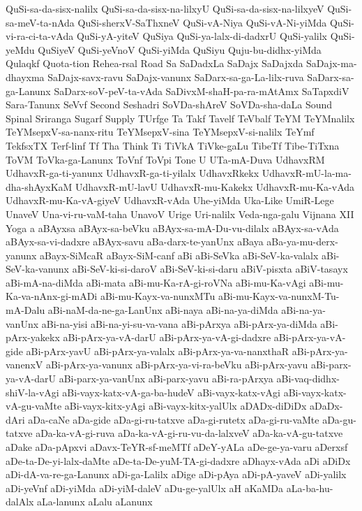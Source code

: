 {QuSi-sa-da-sisx-nalilx
QuSi-sa-da-sisx-na-lilxyU
QuSi-sa-da-sisx-na-lilxyeV
QuSi-sa-meV-ta-nAda
QuSi-sherxV-SaThxneV
QuSi-vA-Niya
QuSi-vA-Ni-yiMda
QuSi-vi-ra-ci-ta-vAda
QuSi-yA-yiteV
QuSiya
QuSi-ya-lalx-di-dadxrU
QuSi-yalilx
QuSi-yeMdu
QuSiyeV
QuSi-yeVnoV
QuSi-yiMda
QuSiyu
Quju-bu-didhx-yiMda
Qulaqkf
Quota-tion
Rehea-rsal
Road
Sa
SaDadxLa
SaDajx
SaDajxda
SaDajx-ma-dhayxma
SaDajx-savx-ravu
SaDajx-vanunx
SaDarx-sa-ga-La-lilx-ruva
SaDarx-sa-ga-Lanunx
SaDarx-soV-peV-ta-vAda
SaDivxM-shaH-pa-ra-mAtAmx
SaTapxdiV
Sara-Tanunx
SeVvf
Second
Seshadri
SoVDa-shAreV
SoVDa-sha-daLa
Sound
Spinal
Sriranga
Sugarf
Supply
TUrfge
Ta
Takf
Tavelf
TeVbalf
TeYM
TeYMnalilx
TeYMsepxV-sa-nanx-ritu
TeYMsepxV-sina
TeYMsepxV-si-nalilx
TeYmf
TekfsxTX
Terf-linf
Tf
Tha
Think
Ti
TiVkA
TiVke-gaLu
TibeTf
Tibe-TiTxna
ToVM
ToVka-ga-Lanunx
ToVnf
ToVpi
Tone
U
UTa-mA-Duva
UdhavxRM
UdhavxR-ga-ti-yanunx
UdhavxR-ga-ti-yilalx
UdhavxRkekx
UdhavxR-mU-la-ma-dha-shAyxKaM
UdhavxR-mU-lavU
UdhavxR-mu-Kakekx
UdhavxR-mu-Ka-vAda
UdhavxR-mu-Ka-vA-giyeV
UdhavxR-vAda
Uhe-yiMda
Uka-Like
UmiR-Lege
UnaveV
Una-vi-ru-vaM-taha
UnavoV
Urige
Uri-nalilx
Veda-nga-galu
Vijnana
XII
Yoga
a
aBAyxsa
aBAyx-sa-beVku
aBAyx-sa-mA-Du-vu-dilalx
aBAyx-sa-vAda
aBAyx-sa-vi-dadxre
aBAyx-savu
aBa-darx-te-yanUnx
aBaya
aBa-ya-mu-derx-yanunx
aBayx-SiMcaR
aBayx-SiM-canf
aBi
aBi-SeVka
aBi-SeV-ka-valalx
aBi-SeV-ka-vanunx
aBi-SeV-ki-si-daroV
aBi-SeV-ki-si-daru
aBiV-pisxta
aBiV-tasayx
aBi-mA-na-diMda
aBi-mata
aBi-mu-Ka-rA-gi-roVNa
aBi-mu-Ka-vAgi
aBi-mu-Ka-va-nAnx-gi-mADi
aBi-mu-Kayx-va-nunxMTu
aBi-mu-Kayx-va-nunxM-Tu-mA-Dalu
aBi-naM-da-ne-ga-LanUnx
aBi-naya
aBi-na-ya-diMda
aBi-na-ya-vanUnx
aBi-na-yisi
aBi-na-yi-su-va-vana
aBi-pArxya
aBi-pArx-ya-diMda
aBi-pArx-yakekx
aBi-pArx-ya-vA-darU
aBi-pArx-ya-vA-gi-dadxre
aBi-pArx-ya-vA-gide
aBi-pArx-yavU
aBi-pArx-ya-valalx
aBi-pArx-ya-va-nanxthaR
aBi-pArx-ya-vanenxV
aBi-pArx-ya-vanunx
aBi-pArx-ya-vi-ra-beVku
aBi-pArx-yavu
aBi-parx-ya-vA-darU
aBi-parx-ya-vanUnx
aBi-parx-yavu
aBi-ra-pArxya
aBi-vaq-didhx-shiV-la-vAgi
aBi-vayx-katx-vA-ga-ba-hudeV
aBi-vayx-katx-vAgi
aBi-vayx-katx-vA-gu-vaMte
aBi-vayx-kitx-yAgi
aBi-vayx-kitx-yalUlx
aDADx-diDiDx
aDaDx-dAri
aDa-caNe
aDa-gide
aDa-gi-ru-tatxve
aDa-gi-rutetx
aDa-gi-ru-vaMte
aDa-gu-tatxve
aDa-ka-vA-gi-ruva
aDa-ka-vA-gi-ru-vu-da-lalxveV
aDa-ka-vA-gu-tatxve
aDake
aDa-pApxvi
aDavx-TeYR-sf-meMTf
aDeY-yALa
aDe-ge-ya-varu
aDerxsf
aDe-ta-De-yi-lalx-daMte
aDe-ta-De-yuM-TA-gi-dadxre
aDhayx-vAda
aDi
aDiDx
aDi-dA-va-re-ga-Lanunx
aDi-ga-Lalilx
aDige
aDi-pAya
aDi-pA-yaveV
aDi-yalilx
aDi-yeVnf
aDi-yiMda
aDi-yiM-daleV
aDu-ge-yalUlx
aH
aKaMDa
aLa-ba-hu-dalAlx
aLa-lanunx
aLalu
aLanunx
}
